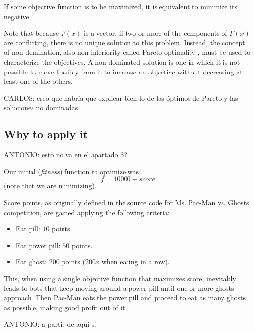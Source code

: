 \documentclass{llncs}
\newcommand{\pacman}{Ms. Pac-Man vs. Ghosts }
\newcommand{\paco}{Pac-Man }
\begin{document}
If some objective function is to be maximized, it is equivalent to minimize its negative.

Note that because $F(x)$ is a vector, if two or more of the components of $F(x)$ are conflicting, there is no unique solution to this problem. Instead, the concept of non-domination, also non-inferiority called Pareto optimality \cite{Censor:78}, must be used to characterize the objectives. A non-dominated solution is one in which it is not possible to move feasibly from it to increase an objective without decreasing at least one of the others.

{\color{red}CARLOS: creo que habría que explicar bien lo de los óptimos de Pareto y las soluciones no dominadas}



\subsection{Why to apply it}

{\color{red}ANTONIO: esto no va en el apartado 3?}

Our initial (\textit{fitness}) function to optimize was
\begin{equation} %
f = 10000 - score
\end{equation}
(note that we are minimizing).

Score points, as originally defined in the source code for \pacman competition, are gained applying the following criteria:
\begin{itemize}
\label{vanilla_pacman_score}
\item Eat pill: $10$ points.
\item Eat power pill: $50$ points.
\item Eat ghost: $200$ points ($200x$ when eating in a row).
\end{itemize}

This, when using a single objective function that maximizes score, inevitably leads to bots that keep moving around a power pill until one or more ghosts approach. Then \paco eats the power pill and proceed to eat as many ghosts as possible, making good profit out of it.

{\color{red}ANTONIO: a partir de aquí sí}
\end{document}

